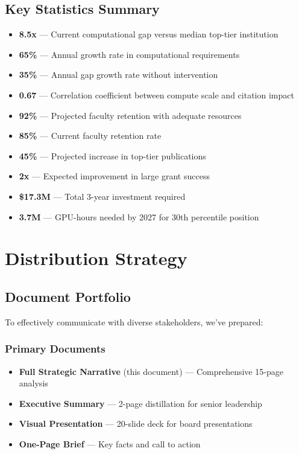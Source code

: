 \documentclass{article}
\begin{document}
\subsection{Key Statistics Summary}

\begin{itemize}
\item \textbf{8.5x} --- Current computational gap versus median top-tier institution
\item \textbf{65\%} --- Annual growth rate in computational requirements
\item \textbf{35\%} --- Annual gap growth rate without intervention
\item \textbf{0.67} --- Correlation coefficient between compute scale and citation impact
\item \textbf{92\%} --- Projected faculty retention with adequate resources
\item \textbf{85\%} --- Current faculty retention rate
\item \textbf{45\%} --- Projected increase in top-tier publications
\item \textbf{2x} --- Expected improvement in large grant success
\item \textbf{\$17.3M} --- Total 3-year investment required
\item \textbf{3.7M} --- GPU-hours needed by 2027 for 30th percentile position
\end{itemize}

\section{Distribution Strategy}

\subsection{Document Portfolio}

To effectively communicate with diverse stakeholders, we've prepared:

\subsubsection{Primary Documents}
\begin{itemize}
\item \textbf{Full Strategic Narrative} (this document) --- Comprehensive 15-page analysis
\item \textbf{Executive Summary} --- 2-page distillation for senior leadership
\item \textbf{Visual Presentation} --- 20-slide deck for board presentations
\item \textbf{One-Page Brief} --- Key facts and call to action
\end{itemize}
\end{document}
